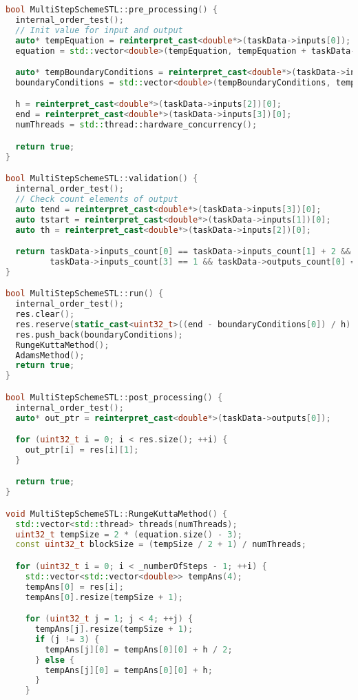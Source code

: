 \documentclass{report}
\begin{document}
\begin{lstlisting}[language=C++,caption=STL версия]
bool MultiStepSchemeSTL::pre_processing() {
  internal_order_test();
  // Init value for input and output
  auto* tempEquation = reinterpret_cast<double*>(taskData->inputs[0]);
  equation = std::vector<double>(tempEquation, tempEquation + taskData->inputs_count[0]);

  auto* tempBoundaryConditions = reinterpret_cast<double*>(taskData->inputs[1]);
  boundaryConditions = std::vector<double>(tempBoundaryConditions, tempBoundaryConditions + taskData->inputs_count[1]);

  h = reinterpret_cast<double*>(taskData->inputs[2])[0];
  end = reinterpret_cast<double*>(taskData->inputs[3])[0];
  numThreads = std::thread::hardware_concurrency();

  return true;
}

bool MultiStepSchemeSTL::validation() {
  internal_order_test();
  // Check count elements of output
  auto tend = reinterpret_cast<double*>(taskData->inputs[3])[0];
  auto tstart = reinterpret_cast<double*>(taskData->inputs[1])[0];
  auto th = reinterpret_cast<double*>(taskData->inputs[2])[0];

  return taskData->inputs_count[0] == taskData->inputs_count[1] + 2 && taskData->inputs_count[2] == 1 &&
         taskData->inputs_count[3] == 1 && taskData->outputs_count[0] == (tend - tstart) / th + 1;
}

bool MultiStepSchemeSTL::run() {
  internal_order_test();
  res.clear();
  res.reserve(static_cast<uint32_t>((end - boundaryConditions[0]) / h) + 2);
  res.push_back(boundaryConditions);
  RungeKuttaMethod();
  AdamsMethod();
  return true;
}

bool MultiStepSchemeSTL::post_processing() {
  internal_order_test();
  auto* out_ptr = reinterpret_cast<double*>(taskData->outputs[0]);

  for (uint32_t i = 0; i < res.size(); ++i) {
    out_ptr[i] = res[i][1];
  }

  return true;
}

void MultiStepSchemeSTL::RungeKuttaMethod() {
  std::vector<std::thread> threads(numThreads);
  uint32_t tempSize = 2 * (equation.size() - 3);
  const uint32_t blockSize = (tempSize / 2 + 1) / numThreads;

  for (uint32_t i = 0; i < _numberOfSteps - 1; ++i) {
    std::vector<std::vector<double>> tempAns(4);
    tempAns[0] = res[i];
    tempAns[0].resize(tempSize + 1);

    for (uint32_t j = 1; j < 4; ++j) {
      tempAns[j].resize(tempSize + 1);
      if (j != 3) {
        tempAns[j][0] = tempAns[0][0] + h / 2;
      } else {
        tempAns[j][0] = tempAns[0][0] + h;
      }
    }


\end{lstlisting}
\end{document}
